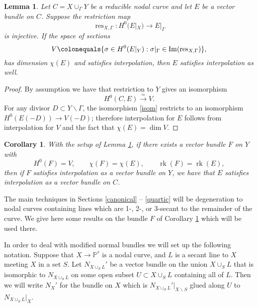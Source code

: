 \documentclass[11pt]{amsart}
\newcommand{\pp}{\mathbb{P}}
\newcommand{\res}{\operatorname{res}}
\newcommand{\sm}{\operatorname{sm}}
\renewcommand{\Im}{\operatorname{Im}}
\newcommand{\rk}{\operatorname{rk}}
\newtheorem{lem}[thm]{Lemma}
\newtheorem{cor}[thm]{Corollary}
\theoremstyle{definition}
\theoremstyle{remark}
\begin{document}
\begin{lem}\label{h0_gluing}
Let $C = X \cup_\Gamma Y$ be a reducible nodal curve and let $E$ be a vector bundle on $C$.  Suppose the restriction map
\[\res_{X,\Gamma} \colon H^0(E|_X) \to E|_\Gamma \]
is injective.  If the space of sections
\[V \colonequals \{\sigma \in H^0(E|_Y) : \sigma|_\Gamma \in \Im(\res_{X,\Gamma}) \},\]
has dimension $\chi(E)$ and satisfies interpolation, then $E$ satisfies interpolation as well.
\end{lem}
\begin{proof}
By assumption we have that restriction to $Y$ gives an isomorphism
\begin{equation}\label{isom} H^0(C, E) \xrightarrow{\simeq} V. \end{equation}
For any divisor $D \subset Y \smallsetminus \Gamma$, the isomorphism \eqref{isom} restricts to an isomorphism $H^0(E(-D)) \to V(-D)$; therefore interpolation for $E$ follows from interpolation for $V$ and the fact that $\chi(E) = \dim V$. \end{proof}
\begin{cor}\label{h0_gluing_vb}
With the setup of Lemma \ref{h0_gluing}, if there exists a vector bundle $F$ on $Y$ with
\[H^0(F) = V, \qquad \chi(F) = \chi(E), \qquad \rk(F) = \rk(E), \]
then if $F$ satisfies interpolation as a vector bundle on $Y$, we have that $E$ satisfies interpolation as a vector bundle on $C$.
\end{cor}


The main techniques in Sections \ref{canonical} -- \ref{quartic} will be degeneration to nodal curves containing lines which are 1-, 2-, or 3-secant to the remainder of the curve.  We give here some results on the bundle $F$ of Corollary \ref{h0_gluing_vb} which will be used there.

In order to deal with modified normal bundles we will set up the following notation.  Suppose that $X \to \pp^r$ is a nodal curve, and $L$ is a secant line to $X$ meeting $X$ in a set $S$.  Let $N_{X\cup_S L}'$ be a vector bundle on the union $X \cup_S L$ that is isomorphic to $N_{X \cup_S L}$ on some open subset $U \subset X \cup_S L$ containing all of $L$.
Then we will write $N_X'$ for the bundle on $X$ which is $N_{X \cup_S L}'|_{X\smallsetminus S}$ glued along $U$ to $N_{X \cup_S L}|_X$.
\end{document}
